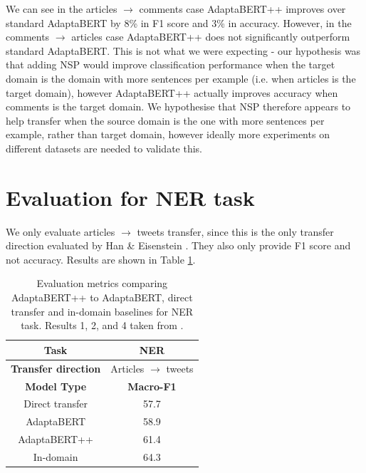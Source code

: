 We can see in the articles $ \rightarrow $ comments case AdaptaBERT++ improves over standard AdaptaBERT by 8\% in F1 score and 3\% in accuracy. However, in the comments $ \rightarrow $ articles case AdaptaBERT++ does not significantly outperform standard AdaptaBERT. This is not what we were expecting - our hypothesis was that adding NSP would improve classification performance when the target domain is the domain with more sentences per example (i.e. when articles is the target domain), however AdaptaBERT++ actually improves accuracy when comments is the target domain. We hypothesise that NSP therefore appears to help transfer when the source domain is the one with more sentences per example, rather than target domain, however ideally more experiments on different datasets are needed to validate this.

\section{Evaluation for NER task}

We only evaluate articles $ \rightarrow $ tweets transfer, since this is the only transfer direction evaluated by Han \& Eisenstein \cite{adaptabert}. They also only provide F1 score and not accuracy. Results are shown in Table \ref{tab:adaptabert-nsp-ner-results}.

\begin{table}[ht]
    \begin{center}
        \begin{tabular}{|c|c|}
            \hline
            \textbf{Task} & NER \\
            \hline
            \textbf{Transfer direction} & Articles $ \rightarrow $ tweets \\
            \hline \hline
            \textbf{Model Type} & \textbf{Macro-F1} \\
            \hline
            Direct transfer & 57.7  \\
            AdaptaBERT & 58.9  \\
            AdaptaBERT++ & 61.4  \\
            \hline
            In-domain & 64.3 \\
            \hline
        \end{tabular}
    \end{center}
    \caption{Evaluation metrics comparing AdaptaBERT++ to AdaptaBERT, direct transfer and in-domain baselines for NER task. Results 1, 2, and 4 taken from \cite{adaptabert}.}
    \label{tab:adaptabert-nsp-ner-results}
\end{table}

